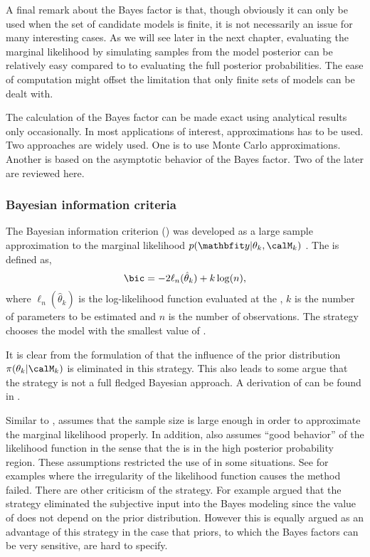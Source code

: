 

A final remark about the Bayes factor is that, though obviously it can only
be used when the set of candidate models is finite, it is not necessarily an
issue for many interesting cases. As we will see later in the next chapter,
evaluating the marginal likelihood by simulating samples from the model
posterior can be relatively easy compared to to evaluating the full posterior
probabilities. The ease of computation might offset the limitation that only
finite sets of models can be dealt with.

The calculation of the Bayes factor can be made exact using analytical results
only occasionally. In most applications of interest, approximations has to be
used. Two approaches are widely used. One is to use Monte Carlo
approximations. Another is based on the asymptotic behavior of the Bayes
factor. Two of the later are reviewed here.

\subsubsection{Bayesian information criteria}
\label{ssub:Bayesian information criteria}

The Bayesian information criterion (\bic) was developed as a large sample
approximation to the marginal likelihood $p(\data|\theta_k,\calM_k)$
\cite{Schwarz:1978uv}. The \bic is defined as,
\begin{equation}
  \text{\bic} = -2\ell_n(\hat\theta_k) + k\log(n),
  \label{eq:bic}
\end{equation}
where $\ell_n(\hat\theta_k)$ is the log-likelihood function evaluated at the
\mle, $k$ is the number of parameters to be estimated and $n$ is the number
of observations. The \bic strategy chooses the model with the smallest value
of \bic.

It is clear from the formulation of \bic that the influence of the prior
distribution $\pi(\theta_k|\calM_k)$ is eliminated in this strategy. This
also leads to some argue that the \bic strategy is not a full fledged Bayesian
approach. A derivation of \bic can be found in
\cite[][sec.~3.2]{Claeskens:2008tq}.

Similar to \aic, \bic assumes that the sample size is large enough in order
to approximate the marginal likelihood properly. In addition, \bic also
assumes ``good behavior'' of the likelihood function in the sense that the
\mle is in the high posterior probability region. These assumptions
restricted the use of \bic in some situations. See \cite{Berger:2001uy}
for examples where the irregularity of the likelihood function causes the
\bic method failed. There are other criticism of the \bic strategy. For
example \cite[][sec.~7.2.3]{Robert:2007tc} argued that the \bic strategy
eliminated the subjective input into the Bayes modeling since the value of
\bic does not depend on the prior distribution. However this is equally
argued as an advantage of this strategy in the case that priors, to which the
Bayes factors can be very sensitive, are hard to specify.

